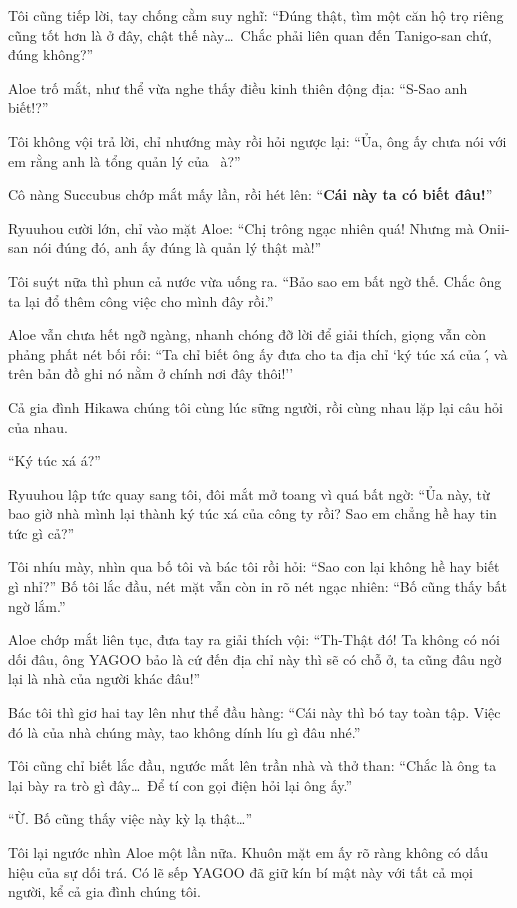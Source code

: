 \documentclass[../main.tex]{subfiles}
\begin{document}
Tôi cũng tiếp lời, tay chống cằm suy nghĩ: ``Đúng thật, tìm một căn hộ trọ riêng cũng tốt hơn là ở đây, chật thế này\dots\ Chắc phải liên quan đến Tanigo-san chứ, đúng không?''

Aloe trố mắt, như thể vừa nghe thấy điều kinh thiên động địa: ``S-Sao anh biết!?''

Tôi không vội trả lời, chỉ nhướng mày rồi hỏi ngược lại: ``Ủa, ông ấy chưa nói với em rằng anh là tổng quản lý của \hll\ à?''

Cô nàng Succubus chớp mắt mấy lần, rồi hét lên: ``\textbf{Cái này ta có biết đâu!}''

Ryuuhou cười lớn, chỉ vào mặt Aloe: ``Chị trông ngạc nhiên quá! Nhưng mà Onii-san nói đúng đó, anh ấy đúng là quản lý thật mà!''

Tôi suýt nữa thì phun cả nước vừa uống ra. ``Bảo sao em bất ngờ thế. Chắc ông ta lại đổ thêm công việc cho mình đây rồi.''

Aloe vẫn chưa hết ngỡ ngàng, nhanh chóng đỡ lời để giải thích, giọng vẫn còn phảng phất nét bối rối: ``Ta chỉ biết ông ấy đưa cho ta địa chỉ `ký túc xá của \hll\', và trên bản đồ ghi nó nằm ở chính nơi đây thôi!''

Cả gia đình Hikawa chúng tôi cùng lúc sững người, rồi cùng nhau lặp lại câu hỏi của nhau.

``Ký túc xá á?''

Ryuuhou lập tức quay sang tôi, đôi mắt mở toang vì quá bất ngờ: ``Ủa này, từ bao giờ nhà mình lại thành ký túc xá của công ty rồi? Sao em chẳng hề hay tin tức gì cả?''

Tôi nhíu mày, nhìn qua bố tôi và bác tôi rồi hỏi: ``Sao con lại không hề hay biết gì nhỉ?'' Bố tôi lắc đầu, nét mặt vẫn còn in rõ nét ngạc nhiên: ``Bố cũng thấy bất ngờ lắm.''

Aloe chớp mắt liên tục, đưa tay ra giải thích vội: ``Th-Thật đó! Ta không có nói dối đâu, ông YAGOO bảo là cứ đến địa chỉ này thì sẽ có chỗ ở, ta cũng đâu ngờ lại là nhà của người khác đâu!''

Bác tôi thì giơ hai tay lên như thể đầu hàng: ``Cái này thì bó tay toàn tập. Việc đó là của nhà chúng mày, tao không dính líu gì đâu nhé.''

Tôi cũng chỉ biết lắc đầu, ngước mắt lên trần nhà và thở than: ``Chắc là ông ta lại bày ra trò gì đây\dots\ Để tí con gọi điện hỏi lại ông ấy.''

``Ừ. Bố cũng thấy việc này kỳ lạ thật\dots''

Tôi lại ngước nhìn Aloe một lần nữa. Khuôn mặt em ấy rõ ràng không có dấu hiệu của sự dối trá. Có lẽ sếp YAGOO đã giữ kín bí mật này với tất cả mọi người, kể cả gia đình chúng tôi.
\end{document}
